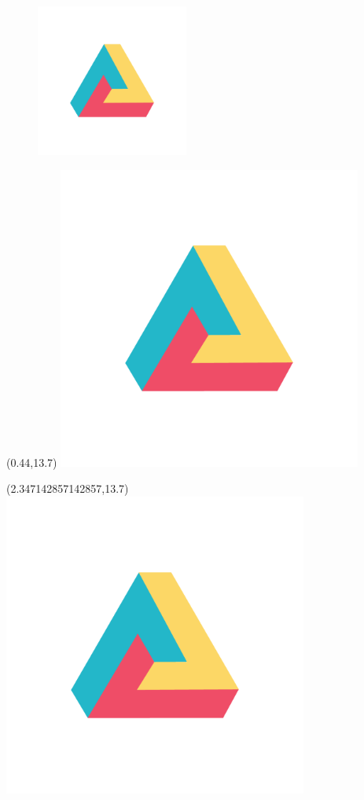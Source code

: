 \documentclass[22pt]{beamer}
\begin{document}
\begin{frame}[fragile]
\begin{textblock}{7.25}
\begin{figure}[htbp]
\includegraphics[height=5cm]{dh.png}
\end{figure}
\end{textblock}

\begin{textblock}{2}(0.44,13.7)
\includegraphics[height=10cm]{dh.png} 
\end{textblock}
\begin{textblock}{2}(2.347142857142857,13.7)
\includegraphics[height=10cm]{dh.png} 

\end{textblock}
\end{frame}
\end{document}
